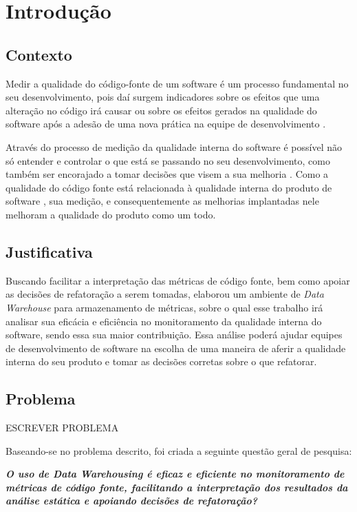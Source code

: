 \chapter{Introdução}

\section{Contexto}

Medir a qualidade do código-fonte  de um software é um processo fundamental no seu desenvolvimento, pois daí surgem indicadores sobre os efeitos que uma alteração no código irá causar ou sobre os efeitos gerados na qualidade do software após a adesão de uma nova prática na equipe de desenvolvimento \cite{Fenton98}. 

Através do processo de medição da qualidade interna do software é possível não só entender e controlar o que está se passando no seu desenvolvimento, como também ser encorajado a tomar decisões que visem a sua melhoria \cite{Fenton98}. Como a qualidade do código fonte está relacionada à qualidade interna do produto de software \cite{ISO25023}, sua medição, e consequentemente as melhorias implantadas nele melhoram a qualidade do produto como um todo. 
 

\section{Justificativa}

Buscando facilitar a interpretação das métricas de código fonte, bem como apoiar as decisões de refatoração a serem tomadas,  elaborou um ambiente de \textit{Data Warehouse} para armazenamento de métricas, sobre o qual esse trabalho irá analisar sua eficácia e eficiência no monitoramento da qualidade interna do software, sendo essa sua maior contribuição. Essa análise poderá ajudar equipes de desenvolvimento de software na escolha de uma maneira de aferir a qualidade interna do seu produto e tomar as decisões corretas sobre o que refatorar.

\section{Problema}

ESCREVER PROBLEMA

Baseando-se no problema descrito, foi criada a seguinte questão geral de pesquisa:

\textbf{\textit{O uso de \textit{Data Warehousing} é eficaz e eficiente no monitoramento de métricas de código fonte, facilitando a interpretação dos resultados da análise estática e apoiando decisões de refatoração?} }

